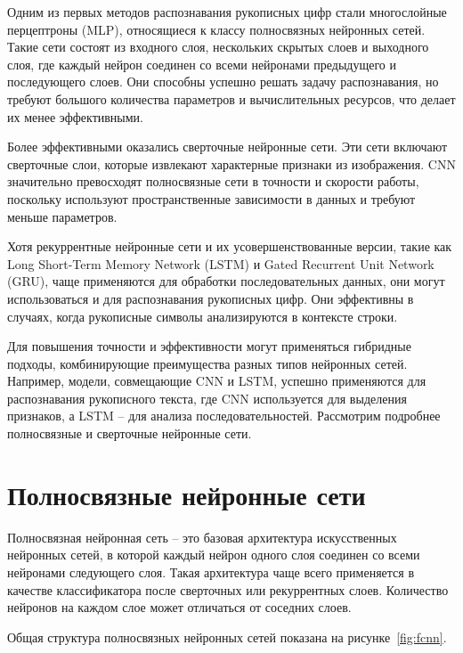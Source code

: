 Одним из первых методов распознавания рукописных цифр стали многослойные 
перцептроны (MLP), относящиеся к классу полносвязных нейронных сетей. 
Такие сети состоят из входного слоя, нескольких скрытых слоев и выходного слоя, 
где каждый нейрон соединен со всеми нейронами предыдущего и последующего слоев. 
Они способны успешно решать задачу распознавания, но 
требуют большого количества параметров и вычислительных ресурсов, что делает 
их менее эффективными.

Более эффективными 
оказались сверточные нейронные сети. Эти сети включают сверточные слои, 
которые извлекают характерные признаки из изображения. CNN значительно 
превосходят полносвязные сети в точности и скорости работы, поскольку 
используют пространственные зависимости в данных и требуют меньше параметров.

Хотя рекуррентные нейронные сети и их усовершенствованные версии, такие 
как Long Short-Term Memory Network (LSTM) и Gated Recurrent Unit Network (GRU),
чаще применяются для обработки последовательных данных, они могут 
использоваться и для распознавания рукописных цифр. Они 
эффективны в случаях, когда рукописные символы анализируются в контексте 
строки.

Для повышения точности и эффективности могут применяться гибридные подходы, 
комбинирующие преимущества разных типов нейронных сетей. Например, модели, 
совмещающие CNN и LSTM, успешно применяются для распознавания рукописного 
текста, где CNN используется для выделения признаков, а LSTM – для анализа 
последовательностей.
Рассмотрим подробнее полносвязные и сверточные нейронные сети.

\section{Полносвязные нейронные сети}\par
\hspace*{12.5 mm}Полносвязная нейронная сеть – 
это базовая архитектура искусственных нейронных сетей, в которой каждый нейрон 
одного слоя соединен со всеми нейронами следующего слоя. Такая архитектура
чаще всего применяется в качестве классификатора после сверточных или 
рекуррентных слоев. Количество нейронов на каждом слое может отличаться от 
соседних слоев.

Общая структура полносвязных нейронных сетей показана на 
рисунке~\ref{fig:fcnn}.

